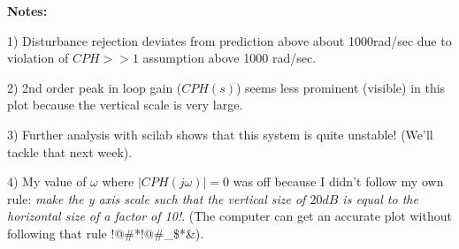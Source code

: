\documentclass{article}	%
\begin{document}
\begin{solution}
{\bf Notes: }

1) Disturbance rejection deviates from prediction above about 1000rad/sec due to violation of $CPH>>1$ assumption above 1000 rad/sec.

2) 2nd order peak in loop gain ($CPH(s)$) seems less prominent (visible) in this plot because the vertical scale is very large.

3) Further analysis with scilab shows that this system is quite unstable!  (We'll tackle that next week).

4) My value of $\omega$ where $|CPH(j\omega)| = 0$ was off because I didn't follow my own rule:  {\it make the y axis scale such that the vertical size of $20dB$ is equal to the horizontal size of a factor of 10!}. (The computer can get an accurate plot without following that rule !@\#*!@\#\_\$*\&).

\end{solution}

\subsection{}
\end{document}

